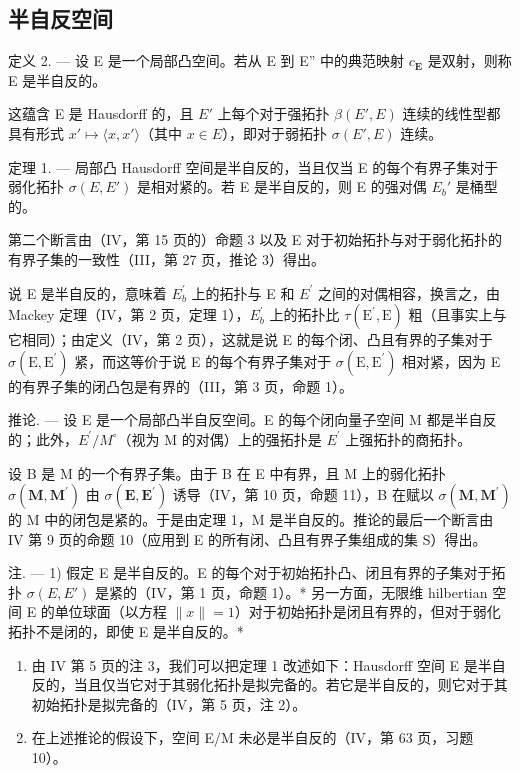 \subsection{半自反空间}

定义 2. --- 设 E 是一个局部凸空间。若从 E 到 E'' 中的典范映射 \(c_{\mathbf{E}}\) 是双射，则称 E 是半自反的。

这蕴含 E 是 Hausdorff 的，且 \(E'\) 上每个对于强拓扑 \(\beta(E', E)\) 连续的线性型都具有形式 \(x' \mapsto \langle x, x' \rangle\)（其中 \(x \in E\)），即对于弱拓扑 \(\sigma(E', E)\) 连续。

定理 1. --- 局部凸 Hausdorff 空间是半自反的，当且仅当 E 的每个有界子集对于弱化拓扑 \(\sigma(E, E')\) 是相对紧的。若 E 是半自反的，则 E 的强对偶 \(E_b'\) 是桶型的。

第二个断言由（IV，第 15 页的）命题 3 以及 E 对于初始拓扑与对于弱化拓扑的有界子集的一致性（III，第 27 页，推论 3）得出。

说 E 是半自反的，意味着 \(E_{b}^{\prime}\) 上的拓扑与 E 和 \(E^{\prime}\) 之间的对偶相容，换言之，由 Mackey 定理（IV，第 2 页，定理 1），\(E_{b}^{\prime}\) 上的拓扑比 \(\tau(\mathrm{E}^{\prime}, \mathrm{E})\) 粗（且事实上与它相同）；由定义（IV，第 2 页），这就是说 E 的每个闭、凸且有界的子集对于 \(\sigma(\mathrm{E}, \mathrm{E}^{\prime})\) 紧，而这等价于说 E 的每个有界子集对于 \(\sigma(\mathrm{E},\mathrm{E}^{\prime})\) 相对紧，因为 E 的有界子集的闭凸包是有界的（III，第 3 页，命题 1）。

推论. --- 设 E 是一个局部凸半自反空间。E 的每个闭向量子空间 M 都是半自反的；此外，\(E^{\prime}/M^{\circ}\)（视为 M 的对偶）上的强拓扑是 \(E^{\prime}\) 上强拓扑的商拓扑。

设 B 是 M 的一个有界子集。由于 B 在 E 中有界，且 M 上的弱化拓扑 \(\sigma(\mathbf{M},\mathbf{M}^{\prime})\) 由 \(\sigma(\mathbf{E},\mathbf{E}^{\prime})\) 诱导（IV，第 10 页，命题 11），B 在赋以 \(\sigma(\mathbf{M},\mathbf{M}^{\prime})\) 的 M 中的闭包是紧的。于是由定理 1，M 是半自反的。推论的最后一个断言由 IV 第 9 页的命题 10（应用到 E 的所有闭、凸且有界子集组成的集 S）得出。

注. --- 1) 假定 E 是半自反的。E 的每个对于初始拓扑凸、闭且有界的子集对于拓扑 \(\sigma(E, E')\) 是紧的（IV，第 1 页，命题 1）。* 另一方面，无限维 hilbertian 空间 E 的单位球面（以方程 \(\|x\|=1\)）对于初始拓扑是闭且有界的，但对于弱化拓扑不是闭的，即使 E 是半自反的。*

\begin{enumerate}
\def\labelenumi{\arabic{enumi})}
\setcounter{enumi}{1}
\item
  由 IV 第 5 页的注 3，我们可以把定理 1 改述如下：Hausdorff 空间 E 是半自反的，当且仅当它对于其弱化拓扑是拟完备的。若它是半自反的，则它对于其初始拓扑是拟完备的（IV，第 5 页，注 2）。
\item
  在上述推论的假设下，空间 E/M 未必是半自反的（IV，第 63 页，习题 10）。
\end{enumerate}

